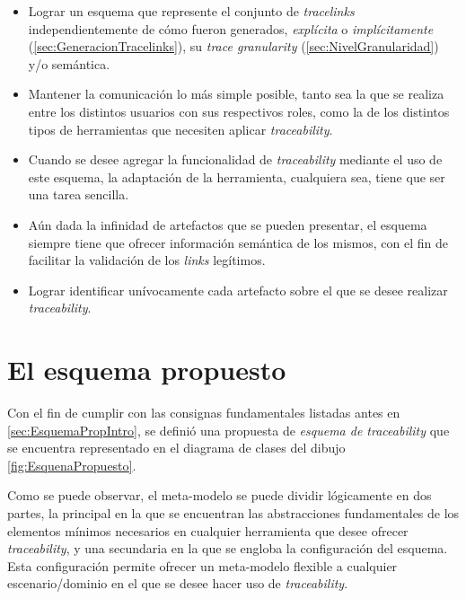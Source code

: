 \documentclass[a4paper,12pt,oneside,spanish]{book}
\begin{document}
\begin{itemize}

\item Lograr un esquema que represente el conjunto de \textit{tracelinks} independientemente de cómo fueron generados, \textit{explícita} o \textit{implícitamente} (\ref{sec:GeneracionTracelinks}), su \textit{trace granularity} (\ref{sec:NivelGranularidad}) y/o semántica.

\item Mantener la comunicación lo más simple posible, tanto sea la que se realiza entre los distintos usuarios con sus respectivos roles, como la de los distintos tipos de herramientas que necesiten aplicar \textit{traceability}.

\item Cuando se desee agregar la funcionalidad de \textit{traceability} mediante el uso de este esquema, la adaptación de la herramienta, cualquiera sea, tiene que ser una tarea sencilla.

\item Aún dada la infinidad de artefactos que se pueden presentar, el esquema siempre tiene que ofrecer información semántica de los mismos, con el fin de facilitar la validación de los \textit{links} legítimos.

\item Lograr identificar unívocamente cada artefacto sobre el que se desee realizar \textit{traceability}.

\end{itemize}

\section{El esquema propuesto}
\label{sec:EsquemaTraceability}

Con el fin de cumplir con las consignas fundamentales listadas antes en \ref{sec:EsquemaPropIntro}, se definió una propuesta de \textit{esquema de traceability} que se encuentra representado en el diagrama de clases del dibujo \ref{fig:EsquenaPropuesto}.

Como se puede observar, el meta-modelo se puede dividir lógicamente en dos partes, la principal en la que se encuentran las abstracciones fundamentales de los elementos mínimos necesarios en cualquier herramienta que desee ofrecer \textit{traceability}, y una secundaria en la que se engloba la configuración del esquema. Esta configuración permite ofrecer un meta-modelo flexible a cualquier escenario/dominio en el que se desee hacer uso de \textit{traceability}.
\end{document}
